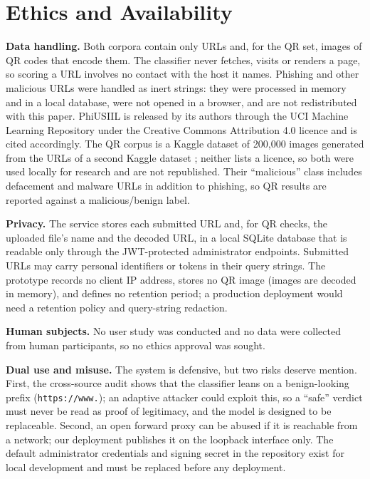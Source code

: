 \documentclass[conference]{IEEEtran}
\begin{document}
\section*{Ethics and Availability}
\textbf{Data handling.} Both corpora contain only URLs and, for the QR set, images of QR codes that
encode them. The classifier never fetches, visits or renders a page, so scoring a URL involves no
contact with the host it names. Phishing and other malicious URLs were handled as inert strings:
they were processed in memory and in a local database, were not opened in a browser, and are not
redistributed with this paper. PhiUSIIL \cite{phiusiil} is released by its authors through the UCI
Machine Learning Repository under the Creative Commons Attribution 4.0 licence and is cited
accordingly. The QR corpus \cite{malibariqr} is a Kaggle dataset of 200{,}000 images generated from
the URLs of a second Kaggle dataset \cite{malibariurl}; neither lists a licence, so both were
used locally for research and are not republished. Their ``malicious'' class includes defacement and
malware URLs in addition to phishing, so QR results are reported against a malicious/benign label.

\textbf{Privacy.} The service stores each submitted URL and, for QR checks, the uploaded file's
name and the decoded URL, in a local SQLite database that is readable only through the
JWT-protected administrator endpoints. Submitted URLs may carry personal identifiers or tokens in
their query strings. The prototype records no client IP address, stores no QR image (images are
decoded in memory), and defines no retention period; a production deployment would need a
retention policy and query-string redaction.

\textbf{Human subjects.} No user study was conducted and no data were collected from human
participants, so no ethics approval was sought.

\textbf{Dual use and misuse.} The system is defensive, but two risks deserve mention. First, the
cross-source audit shows that the classifier leans on a benign-looking prefix
(\texttt{https://www.}); an adaptive attacker could exploit this, so a ``safe'' verdict must never be
read as proof of legitimacy, and the model is designed to be replaceable. Second, an open forward
proxy can be abused if it is reachable from a network; our deployment publishes it on the loopback
interface only. The default administrator credentials and signing secret in the repository exist
for local development and must be replaced before any deployment.
\end{document}
